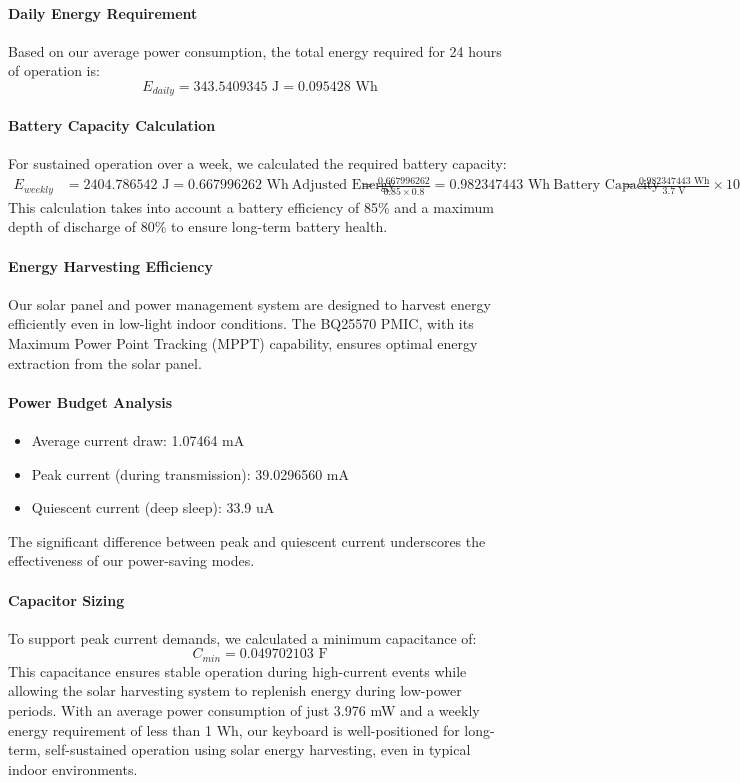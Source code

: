 \documentclass[a4paper,11pt]{article}%
\begin{document}
\paragraph{Daily Energy Requirement}
Based on our average power consumption, the total energy required for 24 hours of operation is:
\begin{equation}
E_{daily} = 343.5409345 \text{ J} = 0.095428 \text{ Wh}
\end{equation}
\paragraph{Battery Capacity Calculation}
For sustained operation over a week, we calculated the required battery capacity:
\begin{align*}
E_{weekly} &= 2404.786542 \text{ J} = 0.667996262 \text{ Wh} \
\text{Adjusted Energy} &= \frac{0.667996262}{0.85 \times 0.8} = 0.982347443 \text{ Wh} \
\text{Battery Capacity} &= \frac{0.982347443 \text{ Wh}}{3.7 \text{ V}} \times 1000 = 265.499309 \text{ mAh}
\end{align*}
This calculation takes into account a battery efficiency of 85\% and a maximum depth of discharge of 80\% to ensure long-term battery health.
\paragraph{Energy Harvesting Efficiency}
Our solar panel and power management system are designed to harvest energy efficiently even in low-light indoor conditions. The BQ25570 PMIC, with its Maximum Power Point Tracking (MPPT) capability, ensures optimal energy extraction from the solar panel.
\paragraph{Power Budget Analysis}
\begin{itemize}
\item Average current draw: 1.07464 mA
\item Peak current (during transmission): 39.0296560 mA
\item Quiescent current (deep sleep): 33.9 uA
\end{itemize}
The significant difference between peak and quiescent current underscores the effectiveness of our power-saving modes.
\paragraph{Capacitor Sizing}
To support peak current demands, we calculated a minimum capacitance of:
\begin{equation}
C_{min} = 0.049702103 \text{ F}
\end{equation}
This capacitance ensures stable operation during high-current events while allowing the solar harvesting system to replenish energy during low-power periods.
With an average power consumption of just 3.976 mW and a weekly energy requirement of less than 1 Wh, our keyboard is well-positioned for long-term, self-sustained operation using solar energy harvesting, even in typical indoor environments.
\end{document}
